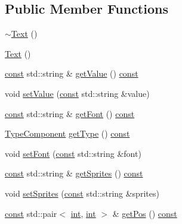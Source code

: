 \subsection*{Public Member Functions}
\begin{DoxyCompactItemize}
\item 
\hyperlink{classarcade_1_1_text_a5392e4ad2c79dbf51143f37aa1dcc36c}{$\sim$\-Text} ()
\item 
\hyperlink{classarcade_1_1_text_af3dac84b69f5f216e8e9b3e58ea802ab}{Text} ()
\item 
\hyperlink{term__entry_8h_a57bd63ce7f9a353488880e3de6692d5a}{const} std\-::string \& \hyperlink{classarcade_1_1_text_a1536c5c108c5067c48358da2f3fe7569}{get\-Value} () \hyperlink{term__entry_8h_a57bd63ce7f9a353488880e3de6692d5a}{const} 
\item 
void \hyperlink{classarcade_1_1_text_aac54f18975b78bc46a877ff27ea35379}{set\-Value} (\hyperlink{term__entry_8h_a57bd63ce7f9a353488880e3de6692d5a}{const} std\-::string \&value)
\item 
\hyperlink{term__entry_8h_a57bd63ce7f9a353488880e3de6692d5a}{const} std\-::string \& \hyperlink{classarcade_1_1_text_a62d0c7e5d97a091135a56cb2bceb63e5}{get\-Font} () \hyperlink{term__entry_8h_a57bd63ce7f9a353488880e3de6692d5a}{const} 
\item 
\hyperlink{namespacearcade_aa1f24da3b3cc32ae8c1b3f36c3c59b21}{Type\-Component} \hyperlink{classarcade_1_1_text_ad01d451dcfcf26112794bc0dc9375ea1}{get\-Type} () \hyperlink{term__entry_8h_a57bd63ce7f9a353488880e3de6692d5a}{const} 
\item 
void \hyperlink{classarcade_1_1_text_aa283de99d97eca177ed9c0522f810c1a}{set\-Font} (\hyperlink{term__entry_8h_a57bd63ce7f9a353488880e3de6692d5a}{const} std\-::string \&font)
\item 
\hyperlink{term__entry_8h_a57bd63ce7f9a353488880e3de6692d5a}{const} std\-::string \& \hyperlink{classarcade_1_1_text_a3f7e08ed6f257fca6b603cedeb7b3cbd}{get\-Sprites} () \hyperlink{term__entry_8h_a57bd63ce7f9a353488880e3de6692d5a}{const} 
\item 
void \hyperlink{classarcade_1_1_text_abb7a63c762781ad8429715e7603e6c30}{set\-Sprites} (\hyperlink{term__entry_8h_a57bd63ce7f9a353488880e3de6692d5a}{const} std\-::string \&sprites)
\item 
\hyperlink{term__entry_8h_a57bd63ce7f9a353488880e3de6692d5a}{const} std\-::pair$<$ \hyperlink{term__entry_8h_ad65b480f8c8270356b45a9890f6499ae}{int}, \hyperlink{term__entry_8h_ad65b480f8c8270356b45a9890f6499ae}{int} $>$ \& \hyperlink{classarcade_1_1_text_a2efd561993c653fbb1e81f29d2f81b81}{get\-Pos} () \hyperlink{term__entry_8h_a57bd63ce7f9a353488880e3de6692d5a}{const} 

\end{DoxyCompactItemize}
